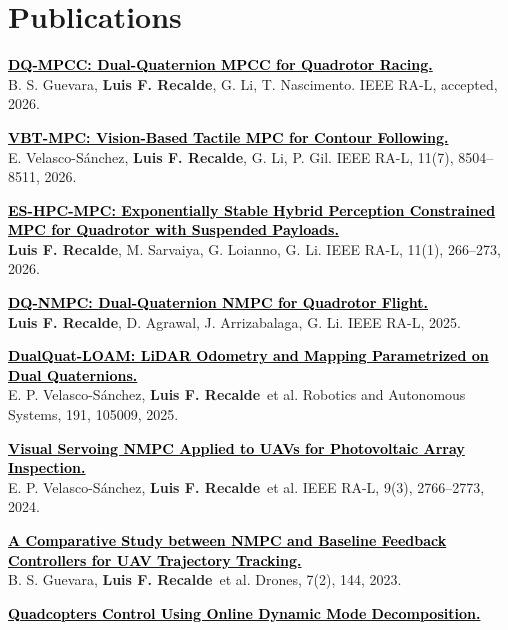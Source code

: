 \documentclass[letterpaper,11pt]{article}
\newcommand{\authorname}{\textcolor{AuthorTeal}{\textbf{Luis F. Recalde}}}
\newcommand{\journal}[1]{\textcolor{HeadingNavy}{#1}}
\newcommand{\papertitle}[1]{\textcolor{black}{\textbf{#1}}}
\begin{document}
\section{Publications}
\begin{enumerate}[leftmargin=0.28in, label={[\arabic*]}, itemsep=2pt, parsep=0pt, topsep=3pt]
\small
\item \href{https://arxiv.org/abs/2609.36482}{\papertitle{DQ-MPCC: Dual-Quaternion MPCC for Quadrotor Racing.}}\\
B. S. Guevara, \authorname, G. Li, T. Nascimento. \journal{IEEE RA-L}, accepted, 2026.
\item \href{https://doi.org/10.1109/LRA.2026.3698362}{\papertitle{VBT-MPC: Vision-Based Tactile MPC for Contour Following.}}\\
E. Velasco-S\'anchez, \authorname, G. Li, P. Gil. \journal{IEEE RA-L}, 11(7), 8504--8511, 2026.
\item \href{https://doi.org/10.1109/LRA.2025.3632070}{\papertitle{ES-HPC-MPC: Exponentially Stable Hybrid Perception Constrained MPC for Quadrotor with Suspended Payloads.}}\\
\authorname, M. Sarvaiya, G. Loianno, G. Li. \journal{IEEE RA-L}, 11(1), 266--273, 2026.
\item \href{https://doi.org/10.1109/LRA.2025.3623022}{\papertitle{DQ-NMPC: Dual-Quaternion NMPC for Quadrotor Flight.}}\\
\authorname, D. Agrawal, J. Arrizabalaga, G. Li. \journal{IEEE RA-L}, 2025.
\item \href{https://doi.org/10.1016/j.robot.2025.105009}{\papertitle{DualQuat-LOAM: LiDAR Odometry and Mapping Parametrized on Dual Quaternions.}}\\
E. P. Velasco-S\'anchez, \authorname\ et al. \journal{Robotics and Autonomous Systems}, 191, 105009, 2025.
\item \href{https://doi.org/10.1109/LRA.2024.3360876}{\papertitle{Visual Servoing NMPC Applied to UAVs for Photovoltaic Array Inspection.}}\\
E. P. Velasco-S\'anchez, \authorname\ et al. \journal{IEEE RA-L}, 9(3), 2766--2773, 2024.
\item \href{https://doi.org/10.3390/drones7020144}{\papertitle{A Comparative Study between NMPC and Baseline Feedback Controllers for UAV Trajectory Tracking.}}\\
B. S. Guevara, \authorname\ et al. \journal{Drones}, 7(2), 144, 2023.
\item \href{https://doi.org/10.1016/j.ifacol.2023.12.088}{\papertitle{Quadcopters Control Using Online Dynamic Mode Decomposition.}}\\

\end{enumerate}
\end{document}

